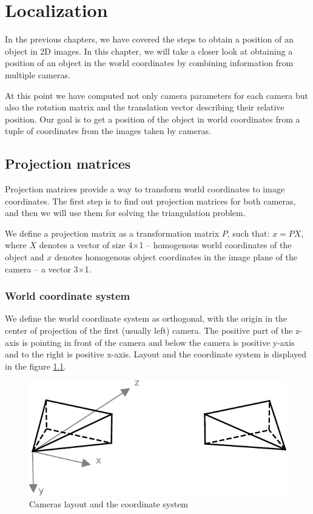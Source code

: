 \chapter{Localization}

In the previous chapters, we have covered the steps to obtain a position of
an object in 2D images. In this chapter, we will take a closer look at
obtaining a position of an object in the world coordinates by combining
information from multiple cameras.

At this point we have computed not only camera parameters for each camera but
also the rotation matrix and the translation vector describing their relative
position. Our goal is to get a position of the object in world coordinates from
a tuple of coordinates from the images taken by cameras.

\section{Projection matrices}
Projection matrices provide a way to transform world coordinates to image
coordinates. The first step is to find out projection matrices for both
cameras, and then we will use them for solving the triangulation problem.

We define a projection matrix as a transformation matrix $P$, such that: $x = P
 X$, where $X$ denotes a vector of size 4$\times$1 -- homogenous world coordinates
of the object and $x$ denotes homogenous object coordinates in the image plane
of the camera -- a vector 3$\times$1.

\subsection{World coordinate system}
We define the world coordinate system as orthogonal, with the origin in the
center of projection of the first (usually left) camera. The positive part of
the z-axis is pointing in front of the camera and below the camera is positive
y-axis and to the right is positive x-axis. Layout and the coordinate system is
displayed in the figure \ref{fig:coordinate-system}.

\begin{figure}
\centering
\includegraphics{img/camera-positions}
\caption{Cameras layout and the coordinate system}
\label{fig:coordinate-system}
\end{figure}


